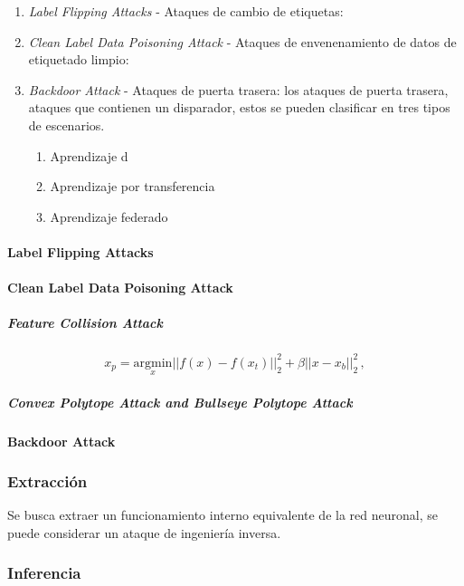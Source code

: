
\begin{enumerate}
  \item \textit{Label Flipping Attacks} - Ataques de cambio de etiquetas:
  \item \textit{Clean Label Data Poisoning Attack} - Ataques de envenenamiento de datos de etiquetado limpio:
  \item \textit{Backdoor Attack} - Ataques de puerta trasera: los ataques de puerta trasera, ataques que contienen un disparador, estos se pueden clasificar en tres tipos de escenarios.
        \begin{enumerate}
          \item Aprendizaje d
          \item Aprendizaje por transferencia
          \item Aprendizaje federado
        \end{enumerate}
\end{enumerate}

\paragraph{Label Flipping Attacks}

\paragraph{Clean Label Data Poisoning Attack}

\subparagraph{Feature Collision Attack}
$$x_{p}={\underset{x}{\mathrm{argmin}}}||f\left(x\right)-f\left(x_{t}\right)||_{2}^{2}+\beta||x-x_{b}||_{2}^{2}\,,$$

\subparagraph{Convex Polytope Attack and Bullseye Polytope Attack}

\paragraph{Backdoor Attack}


\subsubsection{Extracción}

Se busca extraer un funcionamiento interno equivalente de la red neuronal, se puede considerar un ataque de ingeniería inversa.

% 
\subsubsection{Inferencia}

